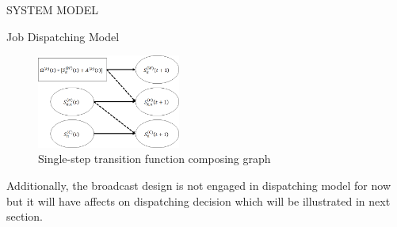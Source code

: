 \documentclass[10pt, conference, letterpaper]{IEEEtran}
\begin{document}
\begin{section}{SYSTEM MODEL}
\begin{subsection}{Job Dispatching Model}
            \begin{figure}[ht]
                \centering
                \includegraphics[width=0.42\textwidth]{single-transition.png}
                \caption{Single-step transition function composing graph}
                \label{fig:trans}
            \end{figure}

            Additionally, the broadcast design is not engaged in dispatching model for now but it will have affects on dispatching decision which will be illustrated in next section.
        \end{subsection}
    \end{section}
\end{document}
